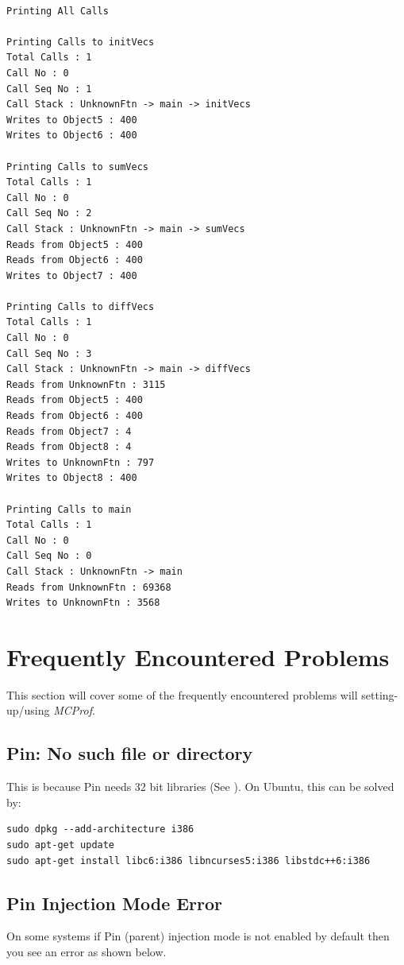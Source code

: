 \documentclass[10pt]{article}
\newcommand{\MCPROF}{\emph{MCProf}}
\begin{document}
{
\scriptsize
\begin{Verbatim}[frame=single]

Printing All Calls

Printing Calls to initVecs
Total Calls : 1
Call No : 0
Call Seq No : 1
Call Stack : UnknownFtn -> main -> initVecs
Writes to Object5 : 400
Writes to Object6 : 400

Printing Calls to sumVecs
Total Calls : 1
Call No : 0
Call Seq No : 2
Call Stack : UnknownFtn -> main -> sumVecs
Reads from Object5 : 400
Reads from Object6 : 400
Writes to Object7 : 400

Printing Calls to diffVecs
Total Calls : 1
Call No : 0
Call Seq No : 3
Call Stack : UnknownFtn -> main -> diffVecs
Reads from UnknownFtn : 3115
Reads from Object5 : 400
Reads from Object6 : 400
Reads from Object7 : 4
Reads from Object8 : 4
Writes to UnknownFtn : 797
Writes to Object8 : 400

Printing Calls to main
Total Calls : 1
Call No : 0
Call Seq No : 0
Call Stack : UnknownFtn -> main
Reads from UnknownFtn : 69368
Writes to UnknownFtn : 3568
\end{Verbatim}
}


\section{Frequently Encountered Problems}
\label{sec:faq}

This section will cover some of the frequently encountered problems will
setting-up/using \MCPROF{}.

\subsection{Pin: No such file or directory}
This is because Pin needs 32 bit libraries (See \cite{PinLibs32}).
On Ubuntu, this can be solved by:
{
\small
\begin{Verbatim}[frame=single, samepage=true]
sudo dpkg --add-architecture i386
sudo apt-get update
sudo apt-get install libc6:i386 libncurses5:i386 libstdc++6:i386
\end{Verbatim}
}


\subsection{Pin Injection Mode Error}

On some systems if Pin (parent) injection mode is not enabled by default then
you see an error as shown below.
\end{document}
